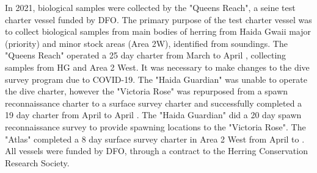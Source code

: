 In 2021, biological samples were collected by the "Queens Reach",
a seine test charter vessel funded by DFO.
The primary purpose of the test charter vessel was to collect biological samples
from main bodies of herring from Haida Gwaii major (priority) and minor stock areas (Area 2W),
identified from soundings.
The "Queens Reach" operated a 25 day charter from March  to April ,
collecting samples from HG and Area 2 West.
It was necessary to make changes to the dive survey program due to COVID-19.
The "Haida Guardian" was unable to operate the dive charter,
however the "Victoria Rose" was repurposed from a spawn reconnaissance charter
to a surface survey charter and successfully completed a 19 day charter from April  to April .
The "Haida Guardian" did a 20 day spawn reconnaissance survey to
provide spawning locations to the "Victoria Rose".
The "Atlas" completed a 8 day surface survey charter in Area 2 West from April  to .
All vessels were funded by DFO, through a contract to the Herring Conservation Research Society.
